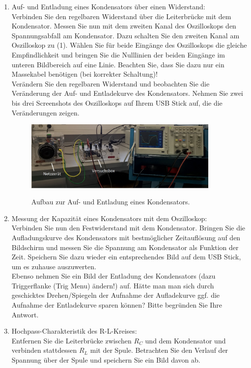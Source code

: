 \begin{enumerate}
 \item Auf- und Entladung eines Kondensators über einen Widerstand:\\
	Verbinden Sie den regelbaren Widerstand über die Leiterbrücke mit dem Kondensator. Messen Sie nun mit dem zweiten Kanal des Oszilloskops den Spannungsabfall am Kondensator. Dazu schalten Sie den
	zweiten Kanal am Oszilloskop zu (1). Wählen Sie für beide Eingänge des Oszilloskops die gleiche Empfindlichkeit und bringen Sie die Nulllinien der beiden Eingänge im unteren Bildbereich auf eine Linie. Beachten Sie, dass Sie dazu nur ein Massekabel benötigen (bei korrekter Schaltung)!\\
	Verändern Sie den regelbaren Widerstand und beobachten Sie die Veränderung der Auf- und Entladekurve des Kondensators. Nehmen Sie zwei bis drei Screenshots des Oszilloskops auf Ihrem USB Stick auf, die die Veränderungen zeigen.
	\begin{figure}[ht!]	
		\centering
		\includegraphics[width=0.9\textwidth]{Abbildungen/Aufbau_RC.jpg}
		\label{fig:Aufbau_RC}
		\caption{Aufbau zur Auf- und Entladung eines Kondensators.}
	\end{figure}
 \item Messung der Kapazität eines Kondensators mit dem Oszilloskop:\\
	Verbinden Sie nun den Festwiderstand mit dem Kondensator. Bringen Sie die Aufladungskurve des Kondensators mit bestmöglicher Zeitauflösung auf den Bildschirm und messen Sie die Spannung am Kondensator als Funktion der Zeit. Speichern Sie dazu wieder ein entsprechendes Bild auf dem USB Stick, um es zuhause auszuwerten.\\
	
 	Ebenso nehmen Sie ein Bild der Entladung des Kondensators (dazu Triggerflanke (Trig Menu) ändern!) auf. Hätte man man sich durch geschicktes Drehen/Spiegeln der Aufnahme der Aufladekurve ggf. die Aufnahme der Entladekurve sparen können? Bitte begründen Sie Ihre Antwort.
 \item Hochpass-Charakteristik des R-L-Kreises:\\
  Entfernen Sie die Leiterbrücke zwischen $R_C$ und dem Kondensator und verbinden stattdessen $R_L$ mit der Spule. Betrachten Sie den Verlauf der Spannung über der Spule und speichern Sie ein Bild davon ab. 
\end{enumerate}

